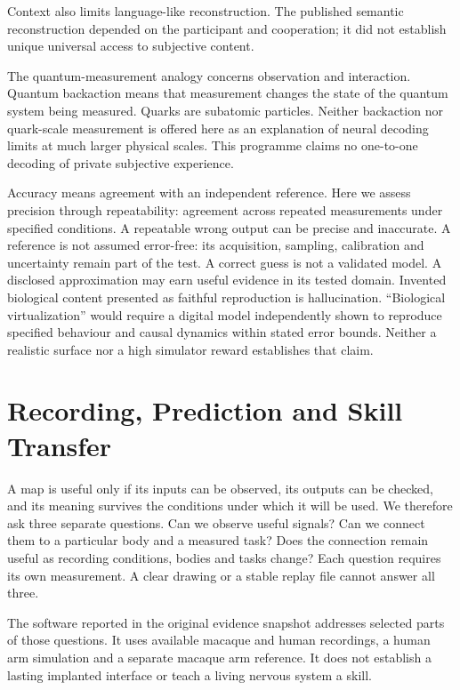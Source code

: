 Context also limits language-like reconstruction. The published semantic reconstruction depended on the participant and cooperation; it did not establish unique universal access to subjective content.\citep{tang2023}

The quantum-measurement analogy concerns observation and interaction. Quantum backaction means that measurement changes the state of the quantum system being measured. Quarks are subatomic particles. Neither backaction nor quark-scale measurement is offered here as an explanation of neural decoding limits at much larger physical scales.\citep{quantum2012} This programme claims no one-to-one decoding of private subjective experience.

Accuracy means agreement with an independent reference. Here we assess precision through
repeatability: agreement across repeated measurements under specified conditions. A repeatable
wrong output can be precise and inaccurate. A reference is not assumed
error-free: its acquisition, sampling, calibration and uncertainty remain part
of the test.\citep{nist1297} A correct guess is not a validated model.
A disclosed approximation may earn useful evidence in its tested domain.
Invented biological content presented as faithful reproduction is hallucination.
``Biological virtualization'' would require a digital model independently shown
to reproduce specified behaviour and causal dynamics within stated error bounds.
Neither a realistic surface nor a high simulator reward establishes that claim.

\section{Recording, Prediction and Skill Transfer}

A map is useful only if its inputs can be observed, its outputs can be checked,
and its meaning survives the conditions under which it will be used. We therefore
ask three separate questions. Can we observe useful signals? Can we connect them
to a particular body and a measured task? Does the connection remain useful as
recording conditions, bodies and tasks change? Each question requires its own
measurement. A clear drawing or a stable replay file cannot answer all three.

The software reported in the original evidence snapshot addresses selected
parts of those questions. It uses available macaque and human recordings, a
human arm simulation and a separate macaque arm reference. It does not establish
a lasting implanted interface or teach a living nervous system a skill.

